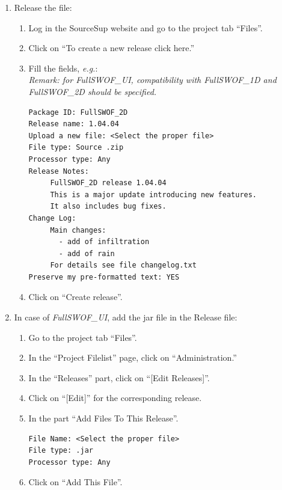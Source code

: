 \documentclass[a4paper, 11pt]{article}
\newcommand{\FullSWOFoneD}{\emph{FullSWOF\_1D}}
\newcommand{\FullSWOFtwoD}{\emph{FullSWOF\_2D}}
\newcommand{\FullSWOFUI}{\emph{FullSWOF\_UI}}
\begin{document}
\begin{enumerate}
\item Release the file:
\begin{enumerate}
\item Log in the SourceSup website and go to the project tab ``Files''.
\item Click on ``To create a new release click here.''
\item Fill the fields, \emph{e.g.}:\\
\emph{Remark: for \FullSWOFUI, compatibility with \FullSWOFoneD{} and \FullSWOFtwoD{} should be specified.}
\begin{verbatim}
Package ID: FullSWOF_2D
Release name: 1.04.04
Upload a new file: <Select the proper file>
File type: Source .zip
Processor type: Any
Release Notes:
     FullSWOF_2D release 1.04.04
     This is a major update introducing new features.
     It also includes bug fixes.
Change Log:
     Main changes:
       - add of infiltration
       - add of rain
     For details see file changelog.txt
Preserve my pre-formatted text: YES
\end{verbatim}
\item Click on ``Create release''.
\end{enumerate}

\color[gray]{0.4}
\item In case of \FullSWOFUI{}, add the jar file in the Release file:
\begin{enumerate}
\item Go to the project tab ``Files''.
\item In the ``Project Filelist'' page, click on ``Administration.''
\item In the ``Releases'' part, click on ``[Edit Releases]''.
\item Click on ``[Edit]'' for the corresponding release.
\item In the part ``Add Files To This Release''.
\begin{verbatim}
File Name: <Select the proper file>
File type: .jar
Processor type: Any
\end{verbatim}
\item Click on ``Add This File''.

\end{enumerate}

\color{black}


\end{enumerate}
\end{document}
